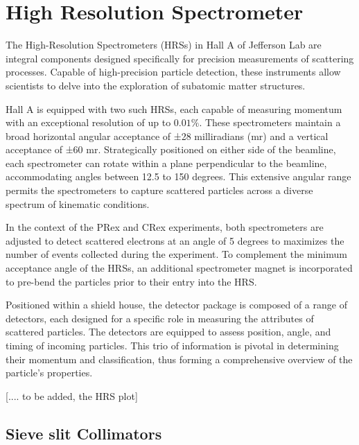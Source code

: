 \section{High Resolution Spectrometer}

The High-Resolution Spectrometers (HRSs) in Hall A of Jefferson Lab are integral components designed specifically for precision measurements of scattering processes. Capable of high-precision particle detection, these instruments allow scientists to delve into the exploration of subatomic matter structures.

Hall A is equipped with two such HRSs, each capable of measuring momentum with an exceptional resolution of up to $0.01\%$. These spectrometers maintain a broad horizontal angular acceptance of ±28 milliradians (mr) and a vertical acceptance of ±60 mr. Strategically positioned on either side of the beamline, each spectrometer can rotate within a plane perpendicular to the beamline, accommodating angles between 12.5 to 150 degrees. This extensive angular range permits the spectrometers to capture scattered particles across a diverse spectrum of kinematic conditions.

In the context of the PRex and CRex experiments, both spectrometers are adjusted to detect scattered electrons at an angle of 5 degrees to maximizes the number of events collected during the experiment. To complement the minimum acceptance angle of the HRSs, an additional spectrometer magnet is incorporated to pre-bend the particles prior to their entry into the HRS.

Positioned within a shield house, the detector package is composed of a range of detectors, each designed for a specific role in measuring the attributes of scattered particles. The detectors are equipped to assess position, angle, and timing of incoming particles. This trio of information is pivotal in determining their momentum and classification, thus forming a comprehensive overview of the particle's properties.

[.... to be added, the HRS plot]

\subsection{Sieve slit Collimators}


